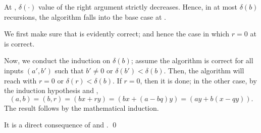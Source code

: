 \documentclass[../modern_algebra_2.tex]{subfiles}
\begin{document}
\begin{myclaim}[Proof]\hfill
\begin{enumerate}[label=(\roman*)]
    \ii
    At , \(\delta(\cdot)\) value of the right argument strictly decreases.
    Hence, in at most \(\delta(b)\) recursions, the algorithm falls into the base case at
    .

    \ii
    We first make sure that  is evidently correct;
    and hence the case in which \(r = 0\) at  is correct.

    Now, we conduct the induction on \(\delta(b)\); assume the algorithm is correct for all inputs
    \((a', b')\) such that \(b' \neq 0\) or \(\delta(b') < \delta(b)\). Then, the algorithm will
    reach  with \(r = 0\) or \(\delta(r) < \delta(b)\). If \(r = 0\), then it is
    done; in the other case, by the induction hypothesis and ,
    \[
        (a, b) = (b, r) = (bx + ry) = (bx + (a - bq)y) = (ay + b(x - qy))\text{.}
    \]
    The result follows by the mathematical induction.

    \ii
    It is a direct consequence of  and .
    \qed
\end{enumerate}
\end{myclaim}
\end{document}
